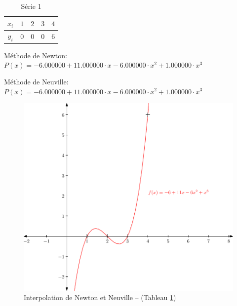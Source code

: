 \documentclass{report}
\begin{document}
      \begin{table}[h]
	\centering
	\begin{tabular}{| c | c | c | c | c |}
	\hline 
	$x_{i}$ & $1$ & $2$ & $3$ & $4$ \\ 
	\hline 
	$y_{i}$ & $0$ & $0$ & $0$ & $6$ \\ 
	\hline 
	\end{tabular}
	\caption{Série 1}
	\label{inter_td3_ex3}
      \end{table}

      Méthode de Newton: $P(x)= -6.000000 + 11.000000 \cdot x- 6.000000 \cdot x^{2}  + 1.000000 \cdot x^{3} $

      Méthode de Neuville: $P(x)= -6.000000 + 11.000000 \cdot x- 6.000000 \cdot x^{2}  + 1.000000 \cdot x^{3} $
      

      
      \begin{figure}[h]
	\centering
	\includegraphics[scale=0.7]{graphiques/pdf_output/inter_test1.pdf}
	\caption{Interpolation de Newton et Neuville -- (Tableau \ref{inter_td3_ex3})}
      \end{figure}
      \newpage
      
\end{document}

